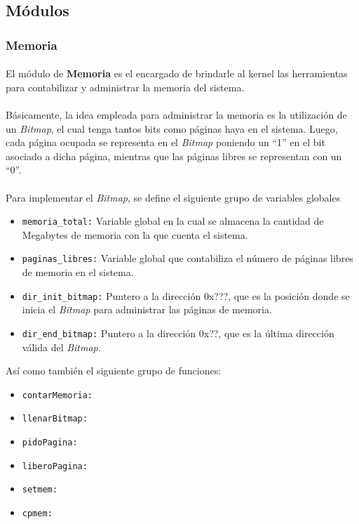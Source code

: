 \documentclass[11pt, a4paper]{article}
\begin{document}
	\subsection{Módulos}
	\label{modulos}
		\subsubsection{Memoria}
			\paragraph{}
			El módulo de \textbf{Memoria} es el encargado de brindarle al kernel las herramientas para contabilizar y administrar la memoria del sistema.
			
			\paragraph{}
			Básicamente, la idea empleada para administrar la memoria es la utilización de un \textit{Bitmap}, el cual tenga tantos bits como páginas haya en el sistema. Luego, cada página ocupada se representa en el \textit{Bitmap} poniendo un ``1'' en el bit asociado a dicha página, mientras que las páginas libres se representan con un ``0''.
			
			\paragraph{}
			Para implementar el \textit{Bitmap}, se define el siguiente grupo de variables globales

			\begin{itemize}
				\item \texttt{memoria\_total:} Variable global en la cual se almacena la cantidad de Megabytes de memoria con la que cuenta el sistema.
				\item \texttt{paginas\_libres:} Variable global que contabiliza el número de páginas libres de memoria en el sistema.
				\item \texttt{dir\_init\_bitmap:} Puntero a la dirección 0x???, que es la posición donde se inicia el \textit{Bitmap} para administrar las páginas de memoria.
				\item \texttt{dir\_end\_bitmap:} Puntero a la dirección 0x??, que es la última dirección válida del \textit{Bitmap}.
			\end{itemize}
			
			Así como también el siguiente grupo de funciones:
			
			\begin{itemize}
				\item \texttt{contarMemoria:} 
				\item \texttt{llenarBitmap:}
				\item \texttt{pidoPagina:}
				\item \texttt{liberoPagina:}
				\item \texttt{setmem:}
				\item \texttt{cpmem:}
			\end{itemize}
\end{document}
